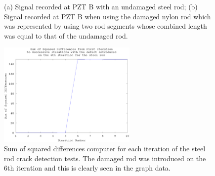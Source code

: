 \begin{figure}[ht!]
\begin{subfigmatrix}{2}
\end{subfigmatrix}

  \caption
  { \label{fig:steelCrackResults}
(a) Signal recorded at PZT B with an undamaged steel rod;
(b) Signal recorded at PZT B when using the damaged nylon rod which was represented by using two rod segments whose combined length was equal to that of the undamaged rod.
}
\end{figure}

\begin{figure}[ht!]
\centering
\includegraphics[width=0.6\textwidth]{eps_pics/steelDifferences}
\caption{Sum of squared differences computer for each iteration of the steel rod crack detection tests. The damaged rod was introduced on the 6th iteration and this is clearly seen in the graph data.
 	 \label{fig:steelDifferences}} 
\end{figure}

